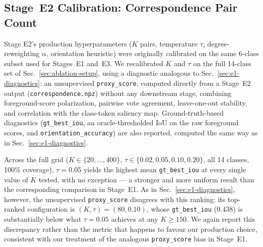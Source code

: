 \subsection{Stage~E2 Calibration: Correspondence Pair Count}
\label{sec:ablation-e2}

Stage E2's production hyperparameters ($K$ pairs, temperature $\tau$,
degree-reweighting $\alpha$, orientation heuristic) were originally
calibrated on the same 6-class subset used for Stages~E1 and~E3. We
recalibrated $K$ and $\tau$ on the full 14-class set of
Sec.~\ref{sec:ablation-setup}, using a diagnostic analogous to
Sec.~\ref{sec:e1-diagnostics}: an unsupervised \texttt{proxy\_score},
computed directly from a Stage~E2 output (\texttt{correspondence.npz})
without any downstream stage, combining foreground-score polarization,
pairwise vote agreement, leave-one-out stability, and correlation with
the class-token saliency map. Ground-truth-based diagnostics
(\texttt{gt\_best\_iou}, an oracle-thresholded IoU on the raw
foreground scores, and \texttt{orientation\_accuracy}) are also
reported, computed the same way as in Sec.~\ref{sec:e1-diagnostics}.

Across the full grid ($K \in \{20,\dots,400\}$, $\tau \in
\{0.02,0.05,0.10,0.20\}$, all 14 classes, 100\% coverage),
$\tau=0.05$ yields the highest mean \texttt{gt\_best\_iou} at every
single value of $K$ tested, with no exception --- a stronger and more
uniform result than the corresponding comparison in Stage~E1. As in
Sec.~\ref{sec:e1-diagnostics}, however, the unsupervised
\texttt{proxy\_score} disagrees with this ranking: its top-ranked
configuration is $(K, \tau) = (80, 0.10)$, whose \texttt{gt\_best\_iou}
($0.438$) is substantially below what $\tau=0.05$ achieves at any
$K \geq 150$. We again report this discrepancy rather than the metric
that happens to favour our production choice, consistent with our
treatment of the analogous \texttt{proxy\_score} bias in Stage~E1.

